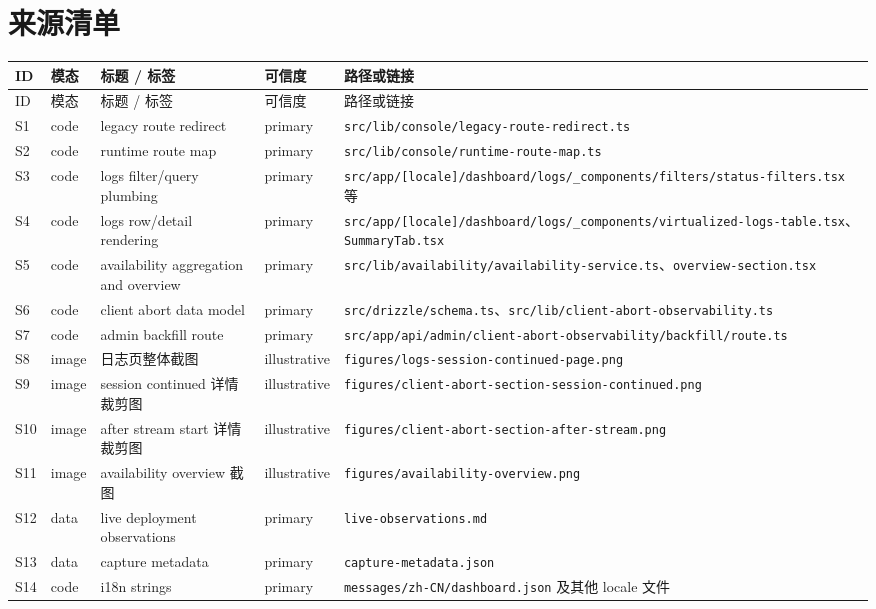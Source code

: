 \documentclass[a4paper]{article}
\newcommand{\filepath}[1]{\nolinkurl{#1}}
\begin{document}
\appendix
\section{来源清单}

\small
\begin{longtable}{p{1.1cm}p{1.5cm}p{3.3cm}p{2.1cm}p{5.1cm}}
\toprule
ID & 模态 & 标题 / 标签 & 可信度 & 路径或链接 \\
\midrule
\endfirsthead
\toprule
ID & 模态 & 标题 / 标签 & 可信度 & 路径或链接 \\
\midrule
\endhead
S1 & code & legacy route redirect & primary & \filepath{src/lib/console/legacy-route-redirect.ts} \\
S2 & code & runtime route map & primary & \filepath{src/lib/console/runtime-route-map.ts} \\
S3 & code & logs filter/query plumbing & primary & \filepath{src/app/[locale]/dashboard/logs/_components/filters/status-filters.tsx} 等 \\
S4 & code & logs row/detail rendering & primary & \filepath{src/app/[locale]/dashboard/logs/_components/virtualized-logs-table.tsx}、\filepath{SummaryTab.tsx} \\
S5 & code & availability aggregation and overview & primary & \filepath{src/lib/availability/availability-service.ts}、\filepath{overview-section.tsx} \\
S6 & code & client abort data model & primary & \filepath{src/drizzle/schema.ts}、\filepath{src/lib/client-abort-observability.ts} \\
S7 & code & admin backfill route & primary & \filepath{src/app/api/admin/client-abort-observability/backfill/route.ts} \\
S8 & image & 日志页整体截图 & illustrative & \filepath{figures/logs-session-continued-page.png} \\
S9 & image & session continued 详情裁剪图 & illustrative & \filepath{figures/client-abort-section-session-continued.png} \\
S10 & image & after stream start 详情裁剪图 & illustrative & \filepath{figures/client-abort-section-after-stream.png} \\
S11 & image & availability overview 截图 & illustrative & \filepath{figures/availability-overview.png} \\
S12 & data & live deployment observations & primary & \filepath{live-observations.md} \\
S13 & data & capture metadata & primary & \filepath{capture-metadata.json} \\
S14 & code & i18n strings & primary & \filepath{messages/zh-CN/dashboard.json} 及其他 locale 文件 \\
\bottomrule
\end{longtable}
\end{document}
